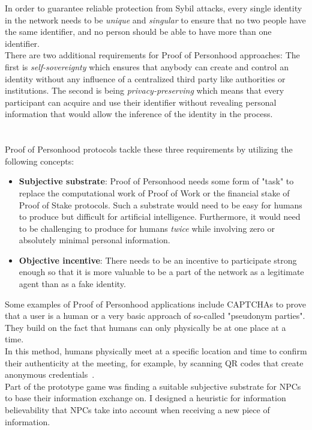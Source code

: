 In order to guarantee reliable protection from Sybil attacks, every single identity in the network needs to be \textit{unique} and \textit{singular} to ensure that no two people have the same identifier, and no person should be able to have more than one identifier.\\
There are two additional requirements for Proof of Personhood approaches: The first is \textit{self-sovereignty} which ensures that anybody can create and control an identity without any influence of a centralized third party like authorities or institutions. The second is being \textit{privacy-preserving} which means that every participant can acquire and use their identifier without revealing personal information that would allow the inference of the identity in the process.\\
\\\\
Proof of Personhood protocols tackle these three requirements by utilizing the following concepts:
\begin{itemize}
	\item \textbf{Subjective substrate}: Proof of Personhood needs some form of "task" to replace the computational work of Proof of Work or the financial stake of Proof of Stake protocols. Such a substrate would need to be easy for humans to produce but difficult for artificial intelligence. Furthermore, it would need to be challenging to produce for humans \textit{twice} while involving zero or absolutely minimal personal information.
	\item \textbf{Objective incentive}: There needs to be an incentive to participate strong enough so that it is more valuable to be a part of the network as a legitimate agent than as a fake identity.
\end{itemize}
Some examples of Proof of Personhood applications include CAPTCHAs to prove that a user is a human or a very basic approach of so-called "pseudonym parties". They build on the fact that humans can only physically be at one place at a time.~\cite{Siddarth2020}\\
In this method, humans physically meet at a specific location and time to confirm their authenticity at the meeting, for example, by scanning QR codes that create anonymous credentials~\cite{Borge2017}.\\
Part of the prototype game was finding a suitable subjective substrate for NPCs to base their information exchange on. I designed a heuristic for information believability that NPCs take into account when receiving a new piece of information.
